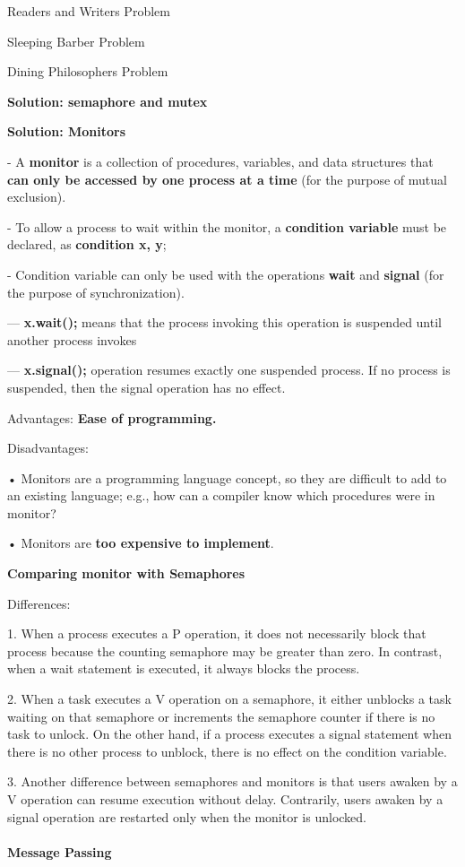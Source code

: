 \documentclass[]{report}
\begin{document}
Readers and Writers Problem

Sleeping Barber Problem

Dining Philosophers Problem

\textbf{Solution: semaphore and mutex}

\textbf{Solution: Monitors}

- A \textbf{monitor} is a collection of procedures, variables, and data
structures that \textbf{can only be accessed by one process at a time}
(for the purpose of mutual exclusion).

- To allow a process to wait within the monitor, a \textbf{condition
variable} must be declared, as \textbf{condition x, y};

- Condition variable can only be used with the operations \textbf{wait}
and \textbf{signal} (for the purpose of synchronization).

--- \textbf{x.wait();}
means that the process invoking this operation is
suspended until another process invokes

--- \textbf{x.signal();} operation resumes exactly one suspended
process. If no process is suspended, then the signal
operation has no effect.

Advantages: \textbf{Ease of programming.}

Disadvantages:

• Monitors are a programming language concept, so they are
difficult to add to an existing language; e.g., how can a
compiler know which procedures were in monitor?

• Monitors are \textbf{too expensive to implement}.

\textbf{Comparing monitor with Semaphores}

Differences:

1. When a process executes a P operation, it does not necessarily block that process
because the counting semaphore may be greater than zero. In contrast, when
a wait statement is executed, it always blocks the process.

2. When a task executes a V operation on a semaphore, it either unblocks a task
waiting on that semaphore or increments the semaphore counter if there is no task
to unlock. On the other hand, if a process executes a signal statement when there
is no other process to unblock, there is no effect on the condition variable.

3. Another difference between semaphores and monitors is that users awaken by
a V operation can resume execution without delay. Contrarily, users awaken by
a signal operation are restarted only when the monitor is unlocked.\\\\
\textbf{Message Passing}
\end{document}
